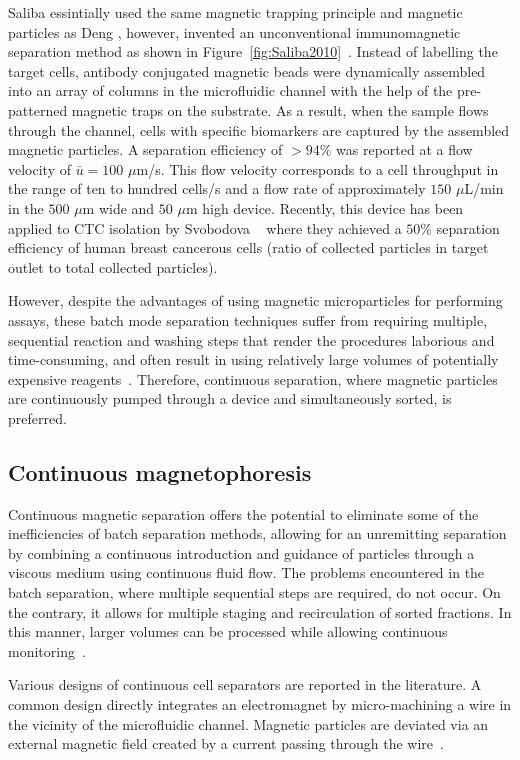 Saliba \etal{} essintially used the same magnetic trapping principle and magnetic particles as Deng \etal{}, however, invented an unconventional immunomagnetic separation method as shown in Figure~\ref{fig:Saliba2010}~\cite{Saliba2010}. Instead of labelling the target cells, antibody conjugated magnetic beads were dynamically assembled into an array of columns in the microfluidic channel with the help of the pre-patterned magnetic traps on the substrate. As a result, when the sample flows through the channel, cells with specific biomarkers are captured by the assembled magnetic particles. A separation efficiency of $>94\%$ was reported at a flow velocity of $\bar{u}=100$ $\mu$m/s. This flow velocity corresponds to a cell throughput in the range of ten to hundred cells/s and a flow rate of approximately $150$ $\mu$L/min in the $500$ $\mu$m wide and $50$ $\mu$m high device. Recently, this device has been applied to CTC isolation by Svobodova \etal{}~\cite{Horak2013,Svobodova2014} where they achieved a $50\%$ separation efficiency of human breast cancerous cells (ratio of collected particles in target outlet to total collected particles).

However, despite the advantages of using magnetic microparticles for performing assays, these batch mode separation techniques suffer from requiring multiple, sequential reaction and washing steps that render the procedures laborious and time-consuming, and often result in using relatively large volumes of potentially expensive reagents~\cite{Thanh2012}. Therefore, continuous separation, where magnetic particles are continuously pumped through a device and simultaneously sorted, is preferred. 

\subsection{Continuous magnetophoresis}
Continuous magnetic separation offers the potential to eliminate some of the inefficiencies of batch separation methods, allowing for an unremitting separation by combining a continuous introduction and guidance of particles through a viscous medium using continuous fluid flow. The problems encountered in the batch separation, where multiple sequential steps are required, do not occur. On the contrary, it allows for multiple staging and recirculation of sorted fractions. In this manner, larger volumes can be processed while allowing continuous monitoring~\cite{Zborowski2011}.

Various designs of continuous cell separators are reported in the literature. A common design directly integrates an electromagnet by micro-machining a wire in the vicinity of the microfluidic channel. Magnetic particles are deviated via an external magnetic field created by a current passing through the wire~\cite{Pekas2005,Derec2010,Siegel2006,Shevkoplyas2007}. 

